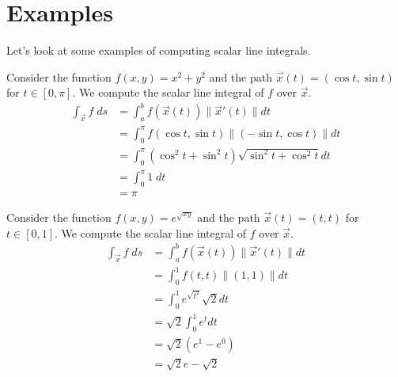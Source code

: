 \documentclass{ximera}
\begin{document}
\section*{Examples}

Let's look at some examples of computing scalar line integrals.

\begin{example}
Consider the function $f(x,y) = x^2+y^2$ and the path $\vec{x}(t) = (\cos t, \sin t)$ for $t\in [0,\pi]$. We compute the scalar line integral of $f$ over $\vec{x}$.
\begin{align*}
\int_{\vec{x}}f\;ds &=  \int_a^b f(\vec{x}(t))\|\vec{x}'(t)\|dt\\
&=  \int_0^{\pi} f(\cos t, \sin t)\|(-\sin t, \cos t)\|dt \\
&= \int_0^{\pi} (\cos^2 t + \sin^2 t)\sqrt{\sin^2 t + \cos^2 t}dt\\
&= \int_0^{\pi} 1\;dt\\
&= \pi
\end{align*}
\end{example}

\begin{example}
Consider the function $f(x,y) = e^{\sqrt{xy}}$ and the path $\vec{x}(t) = (t,t)$ for $t\in [0,1]$. We compute the scalar line integral of $f$ over $\vec{x}$.
\begin{align*}
\int_{\vec{x}}f\;ds &=  \int_a^b f(\vec{x}(t))\|\vec{x}'(t)\|dt\\
&= \int_0^1 f(t,t)\|(1, 1)\|dt\\
&= \int_0^1 e^{\sqrt{t^2}}\sqrt{2}dt\\
&= \sqrt{2}\int_0^1 e^t dt\\
&= \sqrt{2}(e^1 - e^0)\\
&= \sqrt{2}e - \sqrt{2}
\end{align*} 
\end{example}
\end{document}
